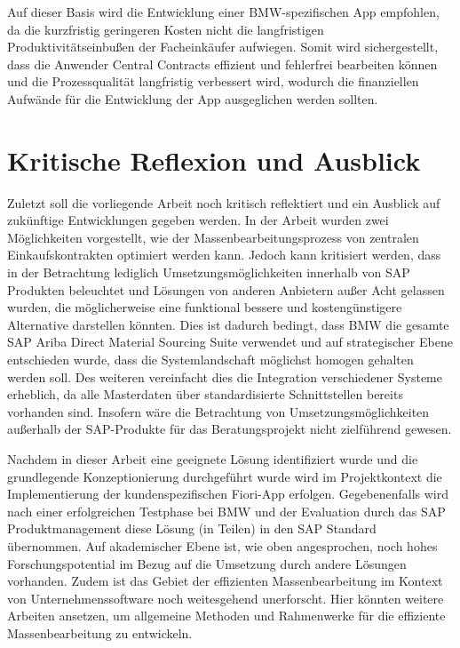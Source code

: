 Auf dieser Basis wird die Entwicklung einer BMW-spezifischen App empfohlen, da die kurzfristig geringeren Kosten nicht die langfristigen Produktivitätseinbu\ss en der Facheinkäufer aufwiegen. Somit wird sichergestellt, dass die Anwender Central Contracts effizient und fehlerfrei bearbeiten können und die Prozessqualität langfristig verbessert wird, wodurch die finanziellen Aufwände für die Entwicklung der App ausgeglichen werden sollten.

\section{Kritische Reflexion und Ausblick}

Zuletzt soll die vorliegende Arbeit noch kritisch reflektiert und ein Ausblick auf zukünftige Entwicklungen gegeben werden. In der Arbeit wurden zwei Möglichkeiten vorgestellt, wie der Massenbearbeitungsprozess von zentralen Einkaufskontrakten optimiert werden kann. Jedoch kann kritisiert werden, dass in der Betrachtung lediglich Umsetzungsmöglichkeiten innerhalb von SAP Produkten beleuchtet und Lösungen von anderen Anbietern au\ss er Acht gelassen wurden, die möglicherweise eine funktional bessere und kostengünstigere Alternative darstellen könnten. Dies ist dadurch bedingt, dass BMW die gesamte SAP Ariba Direct Material Sourcing Suite verwendet und auf strategischer Ebene entschieden wurde, dass die Systemlandschaft möglichst homogen gehalten werden soll. Des weiteren vereinfacht dies die Integration verschiedener Systeme erheblich, da \zB alle Masterdaten über standardisierte Schnittstellen bereits vorhanden sind. Insofern wäre die Betrachtung von Umsetzungsmöglichkeiten au\ss erhalb der SAP-Produkte für das Beratungsprojekt nicht zielführend gewesen.

Nachdem in dieser Arbeit eine geeignete Lösung identifiziert wurde und die grundlegende Konzeptionierung durchgeführt wurde wird im Projektkontext die Implementierung der kundenspezifischen Fiori-App erfolgen. Gegebenenfalls wird nach einer erfolgreichen Testphase bei BMW und der Evaluation durch das SAP Produktmanagement diese Lösung (in Teilen) in den SAP Standard übernommen. Auf akademischer Ebene ist, wie oben angesprochen, noch hohes Forschungspotential im Bezug auf die Umsetzung durch andere Lösungen vorhanden. Zudem ist das Gebiet der effizienten Massenbearbeitung im Kontext von Unternehmenssoftware noch weitesgehend unerforscht. Hier könnten weitere Arbeiten ansetzen, um allgemeine Methoden und Rahmenwerke für die effiziente Massenbearbeitung zu entwickeln.
